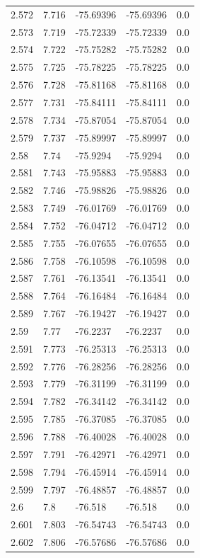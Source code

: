 \begin{tabular}{lllll}
2.572 & 7.716 & -75.69396 & -75.69396 & 0.0 \\
2.573 & 7.719 & -75.72339 & -75.72339 & 0.0 \\
2.574 & 7.722 & -75.75282 & -75.75282 & 0.0 \\
2.575 & 7.725 & -75.78225 & -75.78225 & 0.0 \\
2.576 & 7.728 & -75.81168 & -75.81168 & 0.0 \\
2.577 & 7.731 & -75.84111 & -75.84111 & 0.0 \\
2.578 & 7.734 & -75.87054 & -75.87054 & 0.0 \\
2.579 & 7.737 & -75.89997 & -75.89997 & 0.0 \\
2.58 & 7.74 & -75.9294 & -75.9294 & 0.0 \\
2.581 & 7.743 & -75.95883 & -75.95883 & 0.0 \\
2.582 & 7.746 & -75.98826 & -75.98826 & 0.0 \\
2.583 & 7.749 & -76.01769 & -76.01769 & 0.0 \\
2.584 & 7.752 & -76.04712 & -76.04712 & 0.0 \\
2.585 & 7.755 & -76.07655 & -76.07655 & 0.0 \\
2.586 & 7.758 & -76.10598 & -76.10598 & 0.0 \\
2.587 & 7.761 & -76.13541 & -76.13541 & 0.0 \\
2.588 & 7.764 & -76.16484 & -76.16484 & 0.0 \\
2.589 & 7.767 & -76.19427 & -76.19427 & 0.0 \\
2.59 & 7.77 & -76.2237 & -76.2237 & 0.0 \\
2.591 & 7.773 & -76.25313 & -76.25313 & 0.0 \\
2.592 & 7.776 & -76.28256 & -76.28256 & 0.0 \\
2.593 & 7.779 & -76.31199 & -76.31199 & 0.0 \\
2.594 & 7.782 & -76.34142 & -76.34142 & 0.0 \\
2.595 & 7.785 & -76.37085 & -76.37085 & 0.0 \\
2.596 & 7.788 & -76.40028 & -76.40028 & 0.0 \\
2.597 & 7.791 & -76.42971 & -76.42971 & 0.0 \\
2.598 & 7.794 & -76.45914 & -76.45914 & 0.0 \\
2.599 & 7.797 & -76.48857 & -76.48857 & 0.0 \\
2.6 & 7.8 & -76.518 & -76.518 & 0.0 \\
2.601 & 7.803 & -76.54743 & -76.54743 & 0.0 \\
2.602 & 7.806 & -76.57686 & -76.57686 & 0.0 \\

\end{tabular}
